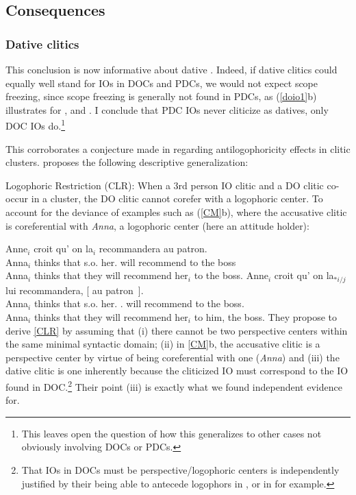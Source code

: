 \documentclass[output=paper]{langsci/langscibook}
\begin{document}
\subsection{Consequences}

\subsubsection{Dative clitics}

This conclusion is now informative about dative .
Indeed, if dative clitics could equally well stand for
\glspl{IO} in \glspl{DOC} and \glspl{PDC}, we
would not expect scope freezing, since scope freezing is generally not found in
\glspl{PDC}, as (\ref{doio1}b) illustrates for , and .
I conclude that \gls{PDC} \glspl{IO}
never cliticize as datives, only \gls{DOC} \glspl{IO} do.\footnote{This leaves
open the question of how this generalizes to other cases not obviously
involving \glspl{DOC} or \glspl{PDC}.}

This corroborates a conjecture made in \cite{Charnavel2015} regarding
antilogophoricity effects in clitic clusters. \cite{Charnavel2015} proposes the
following descriptive generalization:

\ea \label{CLR} Logophoric Restriction (CLR): When a 3rd person IO clitic and a DO clitic co-occur in a cluster, the DO clitic cannot corefer
with a logophoric center.
\z
%
To account for the deviance of examples such as (\ref{CM}b), where the
accusative clitic is coreferential with {\it Anna}, a logophoric center (here
an attitude holder):

\ea \label{CM} \ea
	\gll Anne$_i$ croit qu' on  la$_i$ recommandera au patron.\\
        Anna$_i$ thinks that s.o. her.\Acc{} {will recommend} {to the} boss \\
    \trans Anna$_i$ thinks that they will recommend her$_i$ to the boss.
    \ex
	\gll  Anne$_i$ croit qu' on la$_{*i/j}$ lui recommandera, [ au patron~].\\
    Anna$_i$ thinks that s.o. her.\Acc{} \Third.\Dat{} {will recommend} {} {to the} boss.\\
    \trans Anna$_i$ thinks that they will recommend her$_i$ to him, the boss.
\z
\z
%
They propose to derive \eqref{CLR} by assuming that (i) there cannot be two
perspective centers within the same minimal syntactic domain; (ii) in
\eqref{CM}b, the accusative clitic is a perspective center by virtue of being
coreferential with one ({\it Anna}) and (iii) the dative clitic is one
inherently because the cliticized IO must correspond to the IO found in
DOC.\footnote{That \glspl{IO} in \glspl{DOC} must be perspective/logophoric
    centers is independently justified by their being able to antecede
    logophors in , or in  for example.} Their point (iii) is
    exactly what we found independent evidence for.
\end{document}
